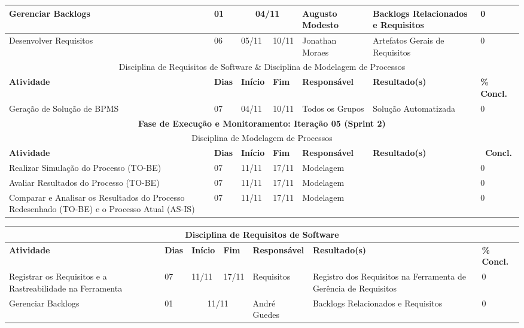 \begin{landscape}
\begin{center}
\begin{tabular}{|m{6cm}|m{1cm}|m{1cm}|m{1cm}|m{4cm}|m{6cm}|m{2cm}|}
			Gerenciar Backlogs & 01 & \multicolumn{2}{c|}{04/11} & Augusto Modesto & Backlogs Relacionados e Requisitos & 0 \\ \hline
			Desenvolver Requisitos & 06 & 05/11 & 10/11 & Jonathan Moraes & Artefatos Gerais de Requisitos & 0 \\ \hline
			\multicolumn{7}{|c|}{Disciplina de Requisitos de Software \& Disciplina de Modelagem de Processos} \\ \hline
			\textbf{Atividade} & \textbf{Dias} & \textbf{Início} & \textbf{Fim} & \textbf{Responsável} & \textbf{Resultado(s)} & \textbf{\% Concl.} \\ \hline
			Geração de Solução de BPMS & 07 & 04/11 & 10/11 & Todos os Grupos & Solução Automatizada & 0 \\ \hline
			\multicolumn{7}{|c|}{\textbf{Fase de Execução e Monitoramento: Iteração 05 (Sprint 2)}} \\
			\hline
			\multicolumn{7}{|c|}{Disciplina de Modelagem de Processos} \\
			\hline
			\textbf{Atividade} & \textbf{Dias} & \textbf{Início} & \textbf{Fim} & \textbf{Responsável} & \textbf{Resultado(s)} & \textbf{\ Concl.} \\ \hline
			Realizar Simulação do Processo (TO-BE) & 07 & 11/11 & 17/11 & Modelagem & & 0 \\ \hline
			Avaliar Resultados do Processo (TO-BE) & 07 & 11/11 & 17/11 & Modelagem & & 0 \\ \hline
			Comparar e Analisar os Resultados do Processo Redesenhado (TO-BE) e o Processo Atual (AS-IS) & 07 & 11/11 & 17/11 & Modelagem & & 0 \\ \hline
			\end{tabular}
		\end{center}
		\begin{center}
			\begin{tabular}{|m{6cm}|m{1cm}|m{1cm}|m{1cm}|m{4cm}|m{6cm}|m{2cm}|}
			\hline
			\multicolumn{7}{|c|}{Disciplina de Requisitos de Software} \\
			\hline
			\textbf{Atividade} & \textbf{Dias} & \textbf{Início} & \textbf{Fim} & \textbf{Responsável} & \textbf{Resultado(s)} & \textbf{\% Concl.} \\ \hline
			Registrar os Requisitos e a Rastreabilidade na Ferramenta & 07 & 11/11 & 17/11 & Requisitos & Registro dos Requisitos na Ferramenta de Gerência de Requisitos & 0 \\ \hline
			Gerenciar Backlogs & 01 & \multicolumn{2}{c|}{11/11} & André Guedes & Backlogs Relacionados e Requisitos & 0 \\ \hline

\end{tabular}
\end{center}
\end{landscape}

